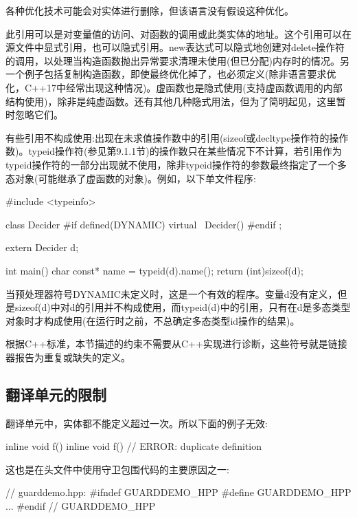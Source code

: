 \begin{notice}
各种优化技术可能会对实体进行删除，但该语言没有假设这种优化。
\end{notice}

此引用可以是对变量值的访问、对函数的调用或此类实体的地址。这个引用可以在源文件中显式引用，也可以隐式引用。new表达式可以隐式地创建对delete操作符的调用，以处理当构造函数抛出异常要求清理未使用(但已分配)内存时的情况。另一个例子包括复制构造函数，即使最终优化掉了，也必须定义(除非语言要求优化，C++17中经常出现这种情况)。虚函数也是隐式使用(支持虚函数调用的内部结构使用)，除非是纯虚函数。还有其他几种隐式用法，但为了简明起见，这里暂时忽略它们。

有些引用不构成使用:出现在未求值操作数中的引用(sizeof或decltype操作符的操作数)。typeid操作符(参见第9.1.1节)的操作数只在某些情况下不计算，若引用作为typeid操作符的一部分出现就不使用，除非typeid操作符的参数最终指定了一个多态对象(可能继承了虚函数的对象)。例如，以下单文件程序:

\begin{cpp}
#include <typeinfo>

class Decider {
	#if defined(DYNAMIC)
	virtual ~Decider() {
	}
	#endif
};

extern Decider d;

int main()
{
	char const* name = typeid(d).name();
	return (int)sizeof(d);
}
\end{cpp}

当预处理器符号DYNAMIC未定义时，这是一个有效的程序。变量d没有定义，但是sizeof(d)中对d的引用并不构成使用，而typeid(d)中的引用，只有在d是多态类型对象时才构成使用(在运行时之前，不总确定多态类型id操作的结果)。

根据C++标准，本节描述的约束不需要从C++实现进行诊断，这些符号就是链接器报告为重复或缺失的定义。

\subsection{翻译单元的限制}

翻译单元中，实体都不能定义超过一次。所以下面的例子无效:

\begin{cpp}
inline void f() {}
inline void f() {} // ERROR: duplicate definition
\end{cpp}

这也是在头文件中使用守卫包围代码的主要原因之一:

\begin{cpp}
// guarddemo.hpp:
#ifndef GUARDDEMO_HPP
#define GUARDDEMO_HPP
...
#endif // GUARDDEMO_HPP
\end{cpp}

